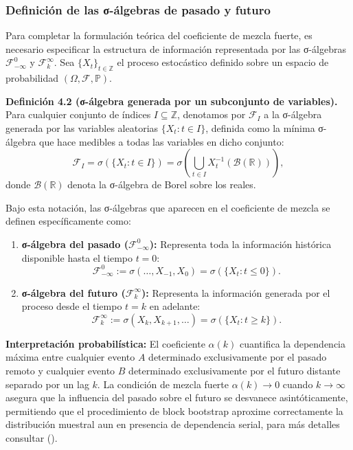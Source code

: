 \documentclass[
  spanish,
  us-letterpaper,
]{scrreprt}
\numberwithin{equation}{section}
\begin{document}
\subsubsection{Definición de las σ-álgebras de pasado y
futuro}\label{definiciuxf3n-de-las-ux3c3-uxe1lgebras-de-pasado-y-futuro}

Para completar la formulación teórica del coeficiente de mezcla fuerte,
es necesario especificar la estructura de información representada por
las σ-álgebras \(\mathcal{F}_{-\infty}^0\) y \(\mathcal{F}_k^\infty\).
Sea \(\{X_t\}_{t \in \mathbb{Z}}\) el proceso estocástico definido sobre
un espacio de probabilidad \((\Omega, \mathcal{F}, \mathbb{P})\).

\textbf{Definición 4.2 (σ-álgebra generada por un subconjunto de
variables).} Para cualquier conjunto de índices
\(I \subseteq \mathbb{Z}\), denotamos por \(\mathcal{F}_I\) a la
σ-álgebra generada por las variables aleatorias \(\{X_t : t \in I\}\),
definida como la mínima σ-álgebra que hace medibles a todas las
variables en dicho conjunto: \[
\mathcal{F}_I = \sigma\left(\{X_t : t \in I\}\right) = \sigma\left(\bigcup_{t \in I} X_t^{-1}(\mathcal{B}(\mathbb{R}))\right),
\] donde \(\mathcal{B}(\mathbb{R})\) denota la σ-álgebra de Borel sobre
los reales.

Bajo esta notación, las σ-álgebras que aparecen en el coeficiente de
mezcla se definen específicamente como:

\begin{enumerate}
\def\labelenumi{\arabic{enumi}.}
\item
  \textbf{σ-álgebra del pasado (\(\mathcal{F}_{-\infty}^0\)):}
  Representa toda la información histórica disponible hasta el tiempo
  \(t=0\): \[
  \mathcal{F}_{-\infty}^0 := \sigma\left(\dots, X_{-1}, X_0\right) = \sigma\left(\{X_t : t \leq 0\}\right).
  \]
\item
  \textbf{σ-álgebra del futuro (\(\mathcal{F}_k^\infty\)):} Representa
  la información generada por el proceso desde el tiempo \(t=k\) en
  adelante: \[
  \mathcal{F}_k^\infty := \sigma\left(X_k, X_{k+1}, \dots\right) = \sigma\left(\{X_t : t \geq k\}\right).
  \]
\end{enumerate}

\textbf{Interpretación probabilística:} El coeficiente \(\alpha(k)\)
cuantifica la dependencia máxima entre cualquier evento \(A\)
determinado exclusivamente por el pasado remoto y cualquier evento \(B\)
determinado exclusivamente por el futuro distante separado por un lag
\(k\). La condición de mezcla fuerte \(\alpha(k) \to 0\) cuando
\(k \to \infty\) asegura que la influencia del pasado sobre el futuro se
desvanece asintóticamente, permitiendo que el procedimiento de block
bootstrap aproxime correctamente la distribución muestral aun en
presencia de dependencia serial, para más detalles consultar
().
\end{document}
